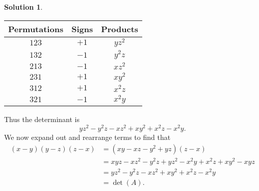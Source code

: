 \documentclass[12pt,a4paper]{article}
\theoremstyle{definition}
\newtheorem*{solution}{Solution} %
\begin{document}
\begin{solution}
	\begin{center}
	\begin{tabular}{ |c|c|c| } 
	\hline
	Permutations & Signs & Products \\
	\hline
	$123$ & $+1$ & $yz^2$ \\
	\hline 
	$132$ & $-1$ & $y^2z$ \\ 
	\hline
	$213$ & $-1$ & $xz^2$ \\ 
	\hline
	$231$ & $+1$ & $xy^2$ \\ 
	\hline
	$312$ & $+1$ & $x^2z$ \\ 
	\hline
	$321$ & $-1$ & $x^2 y$ \\ 
	\hline
	\end{tabular}
	\end{center}
	Thus the determinant is
	\[ yz^2 - y^2 z - xz^2 + xy^2 + x^2z - x^2y. \]
	We now expand out and rearrange terms to find that
	\begin{align*}
		(x-y)(y-z)(z-x) &= (xy - xz - y^2 + yz)(z - x)\\
		&= xyz - xz^2 - y^2z + yz^2 - x^2y + x^2z + xy^2 - xyz\\
		&= yz^2 - y^2 z - xz^2 + xy^2 + x^2z - x^2y\\
		&= \det(A).
	\end{align*}
\end{solution}
\end{document}
